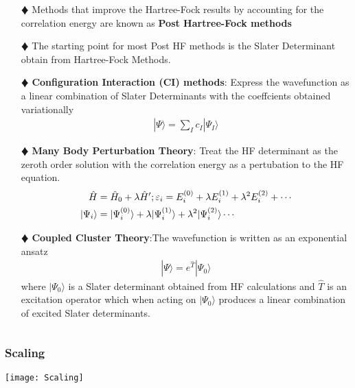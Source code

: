 \documentclass[slidestop,mathserif,compress,xcolor=svgnames]{beamer}
\begin{document}
\begin{frame}
\scriptsize{
\begin{columns}
\column{12cm}
\vspace{-0.5cm}
\begin{block}{}
\begin{itemize}
\item[$\vardiamond$]Methods that improve the Hartree-Fock results by accounting for the correlation energy are known as {\bf Post Hartree-Fock methods}
\item[$\vardiamond$]The starting point for most Post HF methods is the Slater Determinant obtain from Hartree-Fock Methods.
\item[$\vardiamond$]{\bf Configuration Interaction (CI) methods}: Express the wavefunction as a linear combination of Slater Determinants with the coeffcients obtained variationally
\begin{align*}
|\Psi\rangle = \sum_Ic_I|\Psi_I\rangle
\end{align*}
\item[$\vardiamond$]{\bf Many Body Perturbation Theory}: Treat the HF determinant as the zeroth order solution with the correlation energy as a pertubation to the HF equation.
\begin{align*}
\hat{H} &= \hat{H}_0 + \lambda\hat{H}^\prime\vspace{0.5cm};\vspace{0.5cm}
\varepsilon_i = E^{(0)}_i + \lambda E^{(1)}_i + \lambda^2E^{(2)}_i + \cdots\\
|\Psi_i\rangle &= |\Psi^{(0)}_i\rangle + \lambda|\Psi^{(1)}_i\rangle + \lambda^2|\Psi^{(2)}_i\rangle\cdots
\end{align*}
\item[$\vardiamond$]{\bf Coupled Cluster Theory}:The wavefunction is written as an exponential ansatz
\begin{align*}
|\Psi\rangle = e^{\hat{T}}|\Psi_0\rangle
\end{align*}
where $|\Psi_0\rangle$ is a Slater determinant obtained from HF calculations and $\hat{T}$ is an excitation operator which when acting on $|\Psi_0\rangle$ produces a linear combination of excited Slater determinants.
\end{itemize}
\end{block}
\end{columns}
}
\end{frame}

\begin{frame}
\frametitle{\small Scaling}
\begin{center}
\vspace{-1cm}
\texttt{[image: Scaling]}%
\end{center}
\end{frame}
\end{document}
